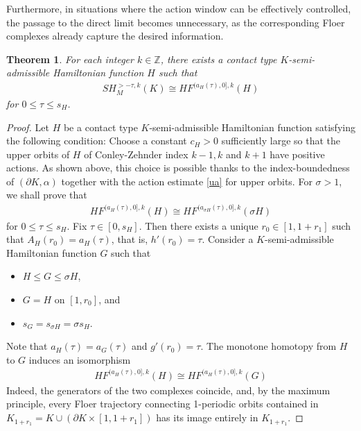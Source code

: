 \documentclass[12pt]{amsart}
\newtheorem{theorem}{Theorem}[section]
\theoremstyle{definition}
\newcommand{\ZZ}{{\mathbb Z}}
\begin{document}
\vspace{0.2cm}
    
Furthermore, in situations where the action window can be effectively controlled, the passage to the direct limit becomes unnecessary, as the corresponding Floer complexes already capture the desired information.
\begin{theorem}\label{hamiso}
For each integer $k \in \ZZ$, there exists a contact type $K$-semi-admissible Hamiltonian function $H$ such that 
    \begin{align*}
        SH^{>-\tau,k}_M(K) \cong HF^{(a_{H}(\tau),0],k}(H)
    \end{align*}
    for $0 \leq \tau \leq s_H$.
\end{theorem}
\begin{proof}
Let $H$ be a contact type $K$-semi-admissible Hamiltonian function satisfying the following condition: Choose a constant $c_{H} >0$ sufficiently large so that the upper orbits of $H$ of Conley-Zehnder index $k-1,k$ and $k+1$ have positive actions. As shown above, this choice is possible thanks to the index-boundedness of $(\partial K, \alpha)$ together with the action estimate \eqref{ua} for upper orbits. For $\sigma>1$, we shall prove that 
\begin{align}
    HF^{(a_H(\tau),0],k}(H) \cong HF^{(a_{\sigma H}(\tau),0],k}(\sigma H)
\end{align}
for $0\leq \tau \leq s_H$. Fix $\tau \in [0,s_H]$. Then there exists a unique $r_0\in [1,1+r_1]$ such that $A_H(r_0) = a_H(\tau)$, that is, $h'(r_0)=\tau$. Consider a $K$-semi-admissible Hamiltonian function $G$ such that\vspace{0.1 cm}
\begin{itemize}
    \item $H \leq G \leq \sigma H$,\vspace{0.2 cm}
    \item $G = H$ on $[1, r_0]$, and\vspace{0.2 cm}
    \item $s_{G} = s_{\sigma H} = \sigma s_H$.\vspace{0.1 cm}
\end{itemize}
Note that $a_H(\tau) = a_G(\tau)$ and $g'(r_0) =\tau$. The monotone homotopy from $H$ to $G$ induces an isomorphism
\begin{align}\label{link1}
    HF^{(a_H(\tau),0],k}(H) \cong HF^{(a_H(\tau),0],k}(G) 
\end{align}
Indeed, the generators of the two complexes coincide, and, by the maximum principle, every Floer trajectory connecting 1-periodic orbits contained in $K_{1+r_1} = K \cup \left( \partial K \times [1,1+r_1] \right)$ has its image entirely in $K_{1+r_1}$. 


\end{proof}
\end{document}
